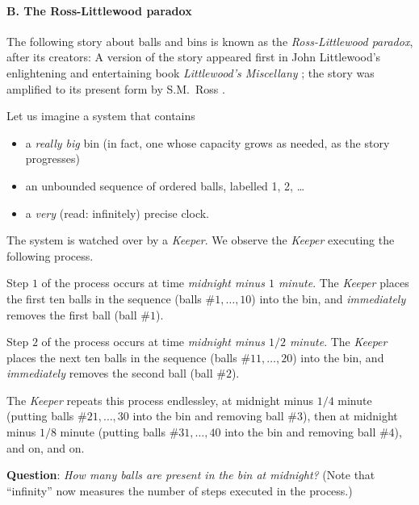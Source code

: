 \paragraph{B. The Ross-Littlewood paradox}

The following story about balls and bins is known as the {\it
  Ross-Littlewood paradox}, after its creators: A version of the story
appeared first in John Littlewood's enlightening and entertaining book
{\it Littlewood's Miscellany} \cite{Littlewood-misc};
 the story was amplified to its present
form by S.M.~Ross \cite{Ross76}. 

Let us imagine a system that contains
\begin{itemize}
\item
a {\em really big} bin (in fact, one whose capacity grows as needed,
as the story progresses)
\item
an unbounded sequence of ordered balls, labelled 1, 2, \ldots
\item
a {\em very} (read: infinitely) precise clock.
\end{itemize}
The system is watched over by a {\it Keeper}.  We observe
the {\it Keeper} executing the following process.

Step $1$ of the process occurs at time {\em midnight minus $1$
  minute}.  The {\it Keeper} places the first ten balls in the
sequence (balls \#$1, \ldots, 10$) into the bin, and {\em immediately}
removes the first ball (ball \#$1$).

Step $2$ of the process occurs at time {\em midnight minus $1/2$
  minute}.  The {\it Keeper} places the next ten balls in the sequence
(balls \#$11, \ldots, 20$) into the bin, and {\em immediately} removes
the second ball (ball \#$2$).

The {\it Keeper} repeats this process endlessley, at midnight minus
$1/4$ minute (putting balls \#$21, \ldots, 30$ into the bin and
removing ball \#$3$), then at midnight minus $1/8$ minute (putting
balls \#$31, \ldots, 40$ into the bin and removing ball \#$4$), and
on, and on.

\noindent
{\bf Question}: {\it How many balls are present in the bin at
  midnight?}  (Note that ``infinity'' now measures the number of steps
executed in the process.)

